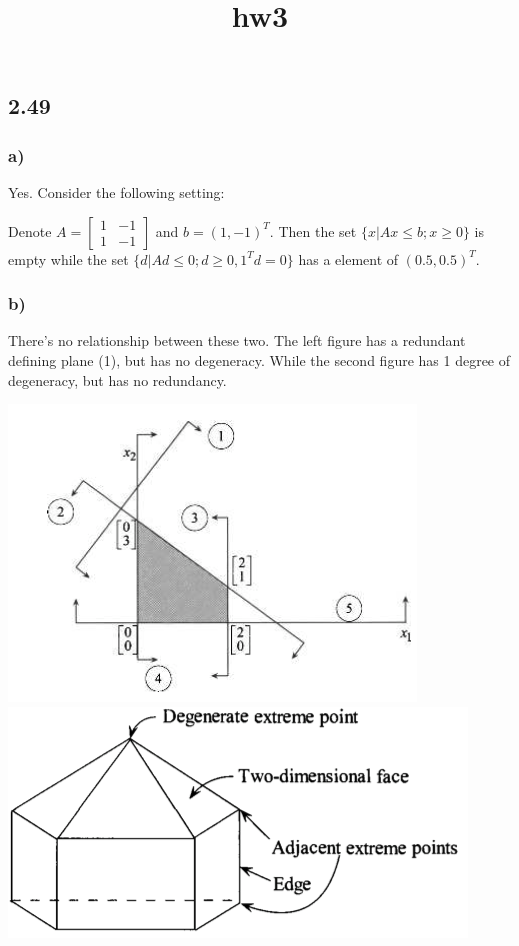 \documentclass[11pt]{article}
\title{hw3}
\makeatletter
\def\maxwidth{\ifdim\Gin@nat@width>\linewidth\linewidth
    \else\Gin@nat@width\fi}
\let\Oldincludegraphics\includegraphics
\renewcommand{\includegraphics}[1]{\Oldincludegraphics[width=.8\maxwidth]{#1}}
\makeatother
\begin{document}
    
    
    \maketitle
    
    

    
    \hypertarget{section}{%
\subsection{2.49}\label{section}}

\hypertarget{a}{%
\subsubsection{a)}\label{a}}

Yes. Consider the following setting:

Denote \(A= \begin{bmatrix}1 & -1 \\ 1 & -1\end{bmatrix}\) and
\(b=(1,-1)^T\). Then the set \(\{x|Ax \leq b; x\geq 0\}\) is empty while
the set \(\{d|Ad\leq 0; d\geq 0, 1^Td=0\}\) has a element of
\((0.5, 0.5)^T\).

\hypertarget{b}{%
\subsubsection{b)}\label{b}}

There's no relationship between these two. The left figure has a
redundant defining plane (1), but has no degeneracy. While the second
figure has 1 degree of degeneracy, but has no redundancy.

\includegraphics{./figs/redundancy.png}
\includegraphics{./figs/degenercy.png}
\end{document}
